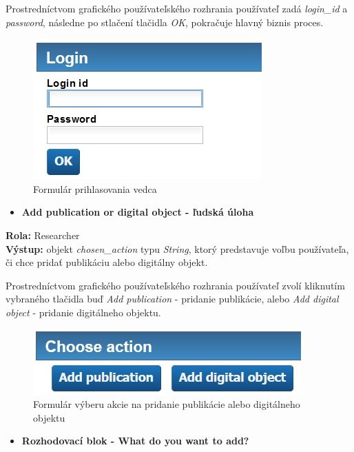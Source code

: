 \documentclass[10pt,oneside,slovak,a4paper]{article}
\begin{document}
Prostredníctvom grafického používateľského rozhrania používateľ zadá \textit{login\_id} a \textit{password}, následne po stlačení tlačidla \textit{OK}, pokračuje hlavný biznis proces.

\begin{figure} [H]
\centering
\includegraphics[scale=0.7]{forms/formLogin.jpg} 
\caption{Formulár prihlasovania vedca}
\end{figure}

\begin{itemize}
\item \textbf{Add publication or digital object
 - ľudská úloha}
\end{itemize}

\textbf{Rola:} Researcher\\
\textbf{Výstup:} objekt \textit{chosen\_action} typu \textit{String}, ktorý predstavuje voľbu používateľa, či chce pridať publikáciu alebo digitálny objekt.

Prostredníctvom grafického používateľského rozhrania používateľ zvolí kliknutím vybraného tlačidla buď \textit{Add publication} - pridanie publikácie, alebo \textit{Add digital object} - pridanie digitálneho objektu.

\begin{figure} [H]
\centering
\includegraphics[scale=0.7]{forms/formChooseAction.jpg} 
\caption{Formulár výberu akcie na pridanie publikácie alebo digitálneho objektu}
\end{figure}

\begin{itemize}
\item \textbf{Rozhodovací blok - What do you want to add?}
\end{itemize}
\end{document}
